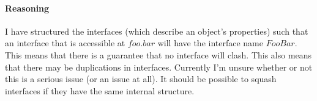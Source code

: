 \documentclass[12pt]{article}
\begin{document}




\paragraph{Reasoning}
I have structured the interfaces (which describe an object's properties) such
that an interface that is accessible at $foo.bar$ will have the interface name $FooBar$.
This means that there is a guarantee that no interface will clash. This also
means that there may be duplications in interfaces. Currently I'm unsure whether
or not this is a serious issue (or an issue at all). It should be possible to
squash interfaces if they have the same internal structure.
\end{document}
